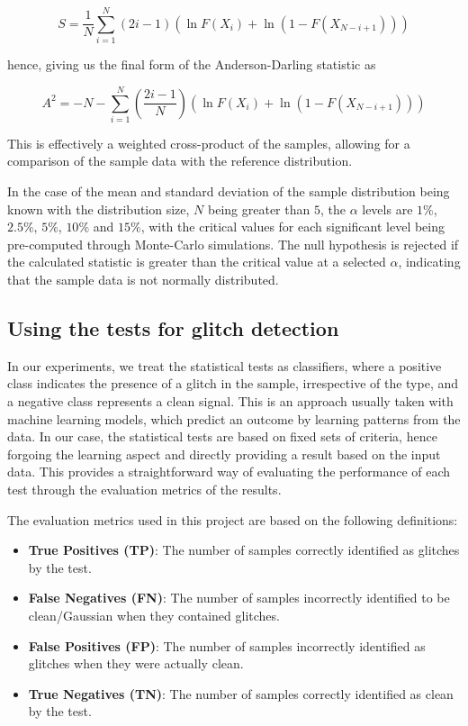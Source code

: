 \documentclass[12pt]{article}
\begin{document}
\begin{equation}
  S =  \frac{1}{N} \sum\limits_{i=1}^{N} \left( 2i - 1 \right) \left( \ln F(X_i) + \ln (1 - F(X_{N-i+1})) \right)
  \label{eq:ad_statistic_full}
\end{equation}

\medskip
\noindent hence, giving us the final form of the Anderson-Darling statistic as

\begin{equation}
  A^2 = -N - \sum\limits_{i=1}^{N} \left( \frac{2i - 1}{N} \right) \left( \ln F(X_i) + \ln (1 - F(X_{N-i+1})) \right)
  \label{eq:ad_statistic_full}
\end{equation}

\noindent This is effectively a weighted cross-product of the samples, allowing for a comparison of the sample data with the reference distribution.

\medskip
\noindent In the case of the mean and standard deviation of the sample distribution being known with the distribution size, $N$ being greater than $5$, the $\alpha$ levels are $1\%$, $2.5\%$, $5\%$, $10\%$ and $15\%$, with the critical values for each significant level being pre-computed through Monte-Carlo simulations. The null hypothesis is rejected if the calculated statistic is greater than the critical value at a selected $\alpha$, indicating that the sample data is not normally distributed.

\subsection{Using the tests for glitch detection}\label{UsingTests}

In our experiments, we treat the statistical tests as classifiers, where a positive class indicates the presence of a glitch in the sample, irrespective of the type, and a negative class represents a clean signal. This is an approach usually taken with machine learning models, which predict an outcome by learning patterns from the data. In our case, the statistical tests are based on fixed sets of criteria, hence forgoing the learning aspect and directly providing a result based on the input data. This provides a straightforward way of evaluating the performance of each test through the evaluation metrics of the results.

\medskip
\noindent The evaluation metrics used in this project are based on the following definitions:

\begin{itemize}
  \item \textbf{True Positives (TP)}: The number of samples correctly identified as glitches by the test.
  \item \textbf{False Negatives (FN)}: The number of samples incorrectly identified to be clean/Gaussian when they contained glitches.
  \item \textbf{False Positives (FP)}: The number of samples incorrectly identified as glitches when they were actually clean.
  \item \textbf{True Negatives (TN)}: The number of samples correctly identified as clean by the test.
\end{itemize}
\end{document}
